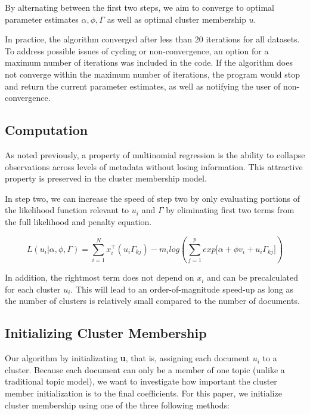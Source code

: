 \documentclass[12pt]{article}
\begin{document}
By alternating between the first two steps, we aim to converge to optimal
parameter estimates $\alpha, \phi, \Gamma$ as well as optimal cluster
membership $u$.

In practice, the algorithm converged after less than 20 iterations for all datasets. To address possible issues of cycling or non-convergence, an option for a maximum number of iterations was included in the code. 
If the algorithm does not converge within the maximum number of iterations, the program would stop and return the current parameter estimates, as well as  notifying the user of non-convergence.

\subsection{Computation}\label{computation}
As noted previously, a property of multinomial regression is the ability to
collapse observations across levels of metadata without losing information. This attractive
property is preserved in the cluster membership model.

In step two, we can increase the speed of step two by only evaluating portions of the likelihood function relevant to $u_i$ and $\Gamma$ by eliminating first two terms from the full likelihood and penalty equation.

\begin{equation} 
L(u_i|\alpha,\phi,\Gamma) = \sum_{i = 1}^{N}{ x_i^\top (u_i \Gamma_{kj})} - m_i log(\sum_{j = 1}^{p}{exp{\big[ \alpha + \phi v_i + u_i \Gamma_{kj} \big]}})
\end{equation}

In addition, the rightmost term does not depend on $x_i$ and can be precalculated for each cluster $u_i$. This will lead to an order-of-magnitude speed-up as long as the number of clusters is relatively small compared to the number of documents. 


\subsection{Initializing Cluster Membership}

Our algorithm by initializating \textbf{u}, that is, assigning each document $u_i$ to a cluster. 
Because each document can only be a member of one topic (unlike a traditional topic model), we want to investigate how important the cluster member initialization is to the final coefficients. 
For this paper, we initialize cluster membership using one of the three following
methods:
\end{document}
